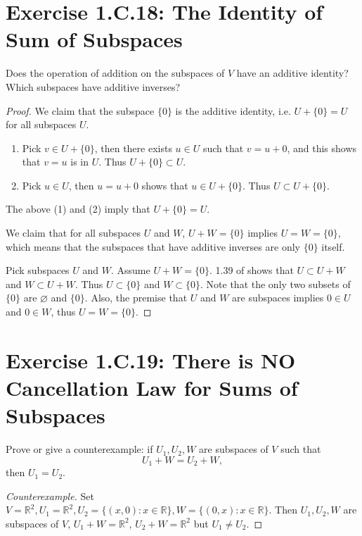 \section{Exercise 1.C.18: The Identity of Sum of Subspaces}
Does the operation of addition on the subspaces of $V$ have an additive identity? Which subspaces have additive inverses?
\begin{proof}
We claim that the subspace $\{0\}$ is the additive identity, i.e. $U+\{0\}=U$ for all subspaces $U$.
\begin{enumerate}
\item Pick $v\in U+\{0\}$, then there exists $u\in U$ such that $v=u+0$, and this shows that $v=u$ is in $U$. Thus $U+\{0\}\subset U$.
\item Pick $u\in U$, then $u=u+0$ shows that $u\in U+\{0\}$. Thus $U\subset U+\{0\}$.
\end{enumerate}
The above (1) and (2) imply that $U+\{0\}=U$.

We claim that for all subspaces $U$ and $W$, $U+W=\{0\}$ implies $U=W=\{0\}$, which means that the subspaces that have additive inverses are only $\{0\}$ itself.

Pick subspaces $U$ and $W$. Assume $U+W=\{0\}$. 1.39 of \cite{axler2014linear} shows that $U\subset U+W$ and $W\subset U+W$. Thus $U\subset \{0\}$ and $W\subset \{0\}$. Note that the only two subsets of $\{0\}$ are $\varnothing$ and $\{0\}$. Also, the premise that $U$ and $W$ are subspaces implies $0\in U$ and $0\in W$, thus $U=W=\{0\}$.
\end{proof}

\section{Exercise 1.C.19: There is NO Cancellation Law for Sums of Subspaces}
Prove or give a counterexample: if $U_1, U_2, W$ are subspaces of $V$ such that
\[
U_1+W=U_2+W,
\]
then $U_1=U_2$.
\begin{proof}[Counterexample]
Set $V=\mathbb{R}^2, U_1=\mathbb{R}^2, U_2=\{(x,0):x\in\mathbb{R}\}, W=\{(0,x):x\in\mathbb{R}\}$. Then $U_1, U_2, W$ are subspaces of $V$, $U_1+W=\mathbb{R}^2$, $U_2+W=\mathbb{R}^2$ but $U_1\ne U_2$.
\end{proof}

